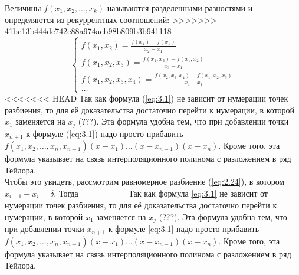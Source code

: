 Величины $f(x_1, x_2, \dots, x_k)$ называются разделенными разностями и определяются из рекуррентных соотношений:
>>>>>>> 41bc13b444dc742e88a974aeb98b809b3b941118
\begin{dmath}
\begin{cases}
	f(x_1, x_2) = \frac{f(x_2) - f(x_1)}{x_2 - x_1} \\ 
	f(x_1, x_2, x_3) = \frac{f(x_2, x_3) - f(x_1, x_2)}{x_3 - x_1} \\ 
	f(x_1, x_2, x_3, x_4) = \frac{f(x_2, x_3, x_4) - f(x_1, x_2, x_3)}{x_4-x_1} \\
	\dots
\end{cases}
\end{dmath}
<<<<<<< HEAD
Так как формула (\ref{eq:3.1}) не зависит от нумерации точек разбиения, то для её доказательства достаточно перейти к нумерации, в которой $x_1$ заменяется на $x_j$ (???). Эта формула удобна тем, что при добавлении точки $x_{n+1}$ к формуле (\ref{eq:3.1}) надо просто прибавить $f(x_1, x_2, \dots, x_n, x_{n+1})(x-x_1)\dots(x-x_{n-1})(x-x_n)$. Кроме того, эта формула указывает на связь интерполяционного полинома с разложением в ряд Тейлора.\\
Чтобы это увидеть, рассмотрим равномерное разбиение (\ref{eq:2.24}), в котором $x_{i+1}-x_i=\delta$. Тогда 
=======
Так как формула \ref{eq:3.1} не зависит от нумерации точек разбиения, то для её доказательства достаточно перейти к нумерации, в которой $x_1$ заменяется на $x_j$ (???). Эта формула удобна тем, что при добавлении точки $x_{n+1}$ к формуле \ref{eq:3.1} надо просто прибавить $f(x_1, x_2, \dots, x_n, x_{n+1})(x-x_1)\dots(x-x_{n-1})(x-x_n)$. Кроме того, эта формула указывает на связь интерполяционного полинома с разложением в ряд Тейлора.

